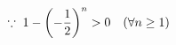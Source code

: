 \documentclass[preview]{standalone}
\begin{document}
\begin{align*}
\special{dvisvgm:raw <g id='unique000'>}\because\; 1-\left(-\frac{1}{2}\right)^n>0\quad(\forall n\ge 1)\special{dvisvgm:raw </g>}
\end{align*}
\end{document}
